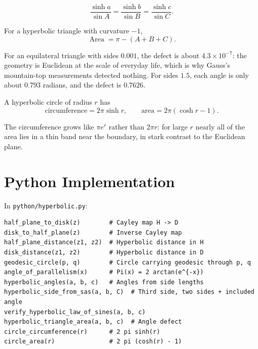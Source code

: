 \begin{theorem}
\[
\frac{\sinh a}{\sin A} = \frac{\sinh b}{\sin B} = \frac{\sinh c}{\sin C}.
\]
\end{theorem}

\begin{theorem}
For a hyperbolic triangle with curvature $-1$,
\[
\operatorname{Area} = \pi - (A + B + C).
\]
\end{theorem}

\begin{example}
For an equilateral triangle with sides $0.001$, the defect is about $4.3 \times 10^{-7}$: the geometry is Euclidean at the scale of everyday life, which is why Gauss's mountain-top measurements detected nothing. For sides $1.5$, each angle is only about $0.793$ radians, and the defect is $0.7626$.
\end{example}

\begin{theorem}
A hyperbolic circle of radius $r$ has
\[
\text{circumference} = 2\pi \sinh r, \qquad \text{area} = 2\pi(\cosh r - 1).
\]
\end{theorem}

The circumference grows like $\pi e^r$ rather than $2\pi r$: for large $r$ nearly all of the area lies in a thin band near the boundary, in stark contrast to the Euclidean plane.

\section{Python Implementation}

In \texttt{python/hyperbolic.py}:

\begin{lstlisting}[style=python, caption={Key functions in python/hyperbolic.py}]
half_plane_to_disk(z)        # Cayley map H -> D
disk_to_half_plane(z)        # Inverse Cayley map
half_plane_distance(z1, z2)  # Hyperbolic distance in H
disk_distance(z1, z2)        # Hyperbolic distance in D
geodesic_circle(p, q)        # Circle carrying geodesic through p, q
angle_of_parallelism(x)      # Pi(x) = 2 arctan(e^{-x})
hyperbolic_angles(a, b, c)   # Angles from side lengths
hyperbolic_side_from_sas(a, b, C)  # Third side, two sides + included angle
verify_hyperbolic_law_of_sines(a, b, c)
hyperbolic_triangle_area(a, b, c)  # Angle defect
circle_circumference(r)      # 2 pi sinh(r)
circle_area(r)               # 2 pi (cosh(r) - 1)
\end{lstlisting}

